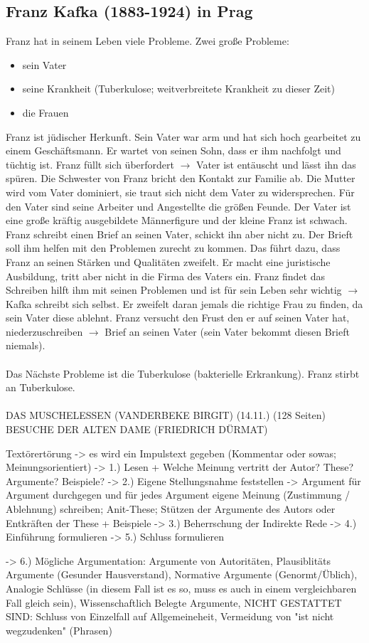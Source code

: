 \documentclass[12pt,a4paper]{article}
\begin{document}
\subsection{Franz Kafka (1883-1924) in Prag}

Franz hat in seinem Leben viele Probleme. Zwei große Probleme:

\begin{itemize}
\item sein Vater
\item seine Krankheit (Tuberkulose; weitverbreitete Krankheit zu dieser Zeit)
\item die Frauen
\end{itemize}
Franz ist jüdischer Herkunft. Sein Vater war arm und hat sich hoch gearbeitet zu einem Geschäftsmann. Er wartet von seinen Sohn, dass er ihm nachfolgt und tüchtig ist. Franz füllt sich überfordert $\rightarrow$ Vater ist entäuscht und lässt ihn das spüren. Die Schwester von Franz bricht den Kontakt zur Familie ab. Die Mutter wird vom Vater dominiert, sie traut sich nicht dem Vater zu widersprechen. Für den Vater sind seine Arbeiter und Angestellte die größen Feunde. Der Vater ist eine große kräftig ausgebildete Männerfigure und der kleine Franz ist schwach. Franz schreibt einen Brief an seinen Vater, schickt ihn aber nicht zu. Der Brieft soll ihm helfen mit den Problemen zurecht zu kommen. Das führt dazu, dass Franz an seinen Stärken und Qualitäten zweifelt. Er macht eine juristische Ausbildung, tritt aber nicht in die Firma des Vaters ein. Franz findet das Schreiben hilft ihm mit seinen Problemen und ist für sein Leben sehr wichtig $\rightarrow$ Kafka schreibt sich selbst. Er zweifelt daran jemals die richtige Frau zu finden, da sein Vater diese ablehnt. Franz versucht den Frust den er auf seinen Vater hat, niederzuschreiben $\rightarrow$ Brief an seinen Vater (sein Vater bekommt diesen Brieft niemals).\\\\
Das Nächste Probleme ist die Tuberkulose (bakterielle Erkrankung). Franz stirbt an Tuberkulose.\\\\
DAS MUSCHELESSEN (VANDERBEKE BIRGIT) (14.11.) (128 Seiten)
BESUCHE DER ALTEN DAME (FRIEDRICH DÜRMAT)

Textörertörung 
-> es wird ein Impulstext gegeben (Kommentar oder sowas; Meinungsorientiert)
-> 1.) Lesen + Welche Meinung vertritt der Autor? These? Argumente? Beispiele?
-> 2.) Eigene Stellungsnahme feststellen -> Argument für Argument durchgegen und für jedes Argument eigene Meinung (Zustimmung / Ablehnung) schreiben; Anit-These; Stützen der Argumente des Autors oder Entkräften der These + Beispiele
-> 3.) Beherrschung der Indirekte Rede
-> 4.) Einführung formulieren
-> 5.) Schluss formulieren

-> 6.) Mögliche Argumentation: Argumente von Autoritäten, Plausiblitäts Argumente (Gesunder Hausverstand), Normative Argumente (Genormt/Üblich), Analogie Schlüsse (in diesem Fall ist es so, muss es auch in einem vergleichbaren Fall gleich sein), Wissenschaftlich Belegte Argumente, NICHT GESTATTET SIND: Schluss von Einzelfall auf Allgemeineheit, Vermeidung von "ist nicht wegzudenken" (Phrasen)
\end{document}
